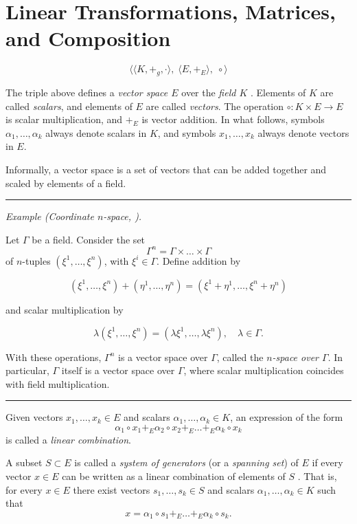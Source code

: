 \chapter{Linear Transformations, Matrices, and Composition}

\[
\Big\langle
\big\langle K, +_g, \cdot \big\rangle,\;
\big\langle E, +_E \big\rangle,\;
\circ
\Big\rangle
\]

The triple above defines a \emph{vector space $E$} over the \emph{field $K$} \cite{cohen}. Elements of $K$ are called \emph{scalars}, and elements of $E$ are called \emph{vectors}. The operation
\(
\circ : K \times E \to E
\)
is scalar multiplication, and $+_E$ is vector addition. In what follows, symbols $\alpha_1,\dots,\alpha_k$ always denote scalars in $K$, and symbols $x_1,\dots,x_k$ always denote vectors in $E$.

\medskip

Informally, a vector space is a set of vectors that can be added together and scaled by elements of a field.

\bigskip
\hrule
\medskip

\textit{Example (Coordinate $n$-space, \cite{greub}).}

Let $\Gamma$ be a field. Consider the set
\[
\Gamma^n = \Gamma \times \dots \times \Gamma
\]
of $n$-tuples $(\xi^1,\dots,\xi^n)$, with $\xi^i \in \Gamma$. Define addition by

\[
(\xi^1,\dots,\xi^n)+(\eta^1,\dots,\eta^n)=(\xi^1+\eta^1,\dots,\xi^n+\eta^n)
\]

and scalar multiplication by

\[
\lambda(\xi^1,\dots,\xi^n)=(\lambda\xi^1,\dots,\lambda\xi^n),\quad \lambda \in \Gamma.
\]

With these operations, $\Gamma^n$ is a vector space over $\Gamma$, called the \emph{$n$-space over $\Gamma$}. In particular, $\Gamma$ itself is a vector space over $\Gamma$, where scalar multiplication coincides with field multiplication.

\medskip
\hrule
\bigskip

Given vectors $x_1,\dots,x_k \in E$ and scalars $\alpha_1,\dots,\alpha_k \in K$, an expression of the form
\[
\alpha_1 \circ x_1 +_E \alpha_2 \circ x_2 +_E \dots +_E \alpha_k \circ x_k
\]
is called a \emph{linear combination}.

\medskip

A subset $S \subset E$ is called a \emph{system of generators} (or a \emph{spanning set}) of $E$ if every vector $x \in E$ can be written as a linear combination of elements of $S$ \cite{greub}. That is, for every $x \in E$ there exist vectors $s_1,\dots,s_k \in S$ and scalars $\alpha_1,\dots,\alpha_k \in K$ such that
\[
x = \alpha_1 \circ s_1 +_E \dots +_E \alpha_k \circ s_k.
\]


